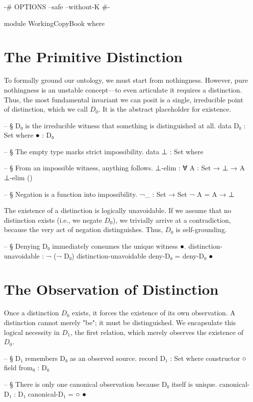 \documentclass[11pt,a4paper]{book}
\begin{document}
\begin{code}
{-# OPTIONS --safe --without-K #-}

module WorkingCopyBook where
\end{code}

\section{The Primitive Distinction}

To formally ground our ontology, we must start from nothingness. However, pure nothingness is an unstable concept—to even articulate it requires a distinction. Thus, the most fundamental invariant we can posit is a single, irreducible point of distinction, which we call $D_0$. It is the abstract placeholder for existence.

\begin{code}
-- § D₀ is the irreducible witness that something is distinguished at all.
data D₀ : Set where
  ● : D₀

-- § The empty type marks strict impossibility.
data ⊥ : Set where

-- § From an impossible witness, anything follows.
⊥-elim : ∀ {A : Set} → ⊥ → A
⊥-elim ()

-- § Negation is a function into impossibility.
¬_ : Set → Set
¬ A = A → ⊥
\end{code}

The existence of a distinction is logically unavoidable. If we assume that no distinction exists (i.e., we negate $D_0$), we trivially arrive at a contradiction, because the very act of negation distinguishes. Thus, $D_0$ is self-grounding.

\begin{code}
-- § Denying D₀ immediately consumes the unique witness ●.
distinction-unavoidable : ¬ (¬ D₀)
distinction-unavoidable deny-D₀ = deny-D₀ ●
\end{code}

\section{The Observation of Distinction}

Once a distinction $D_0$ exists, it forces the existence of its own observation. A distinction cannot merely "be"; it must be distinguished. We encapsulate this logical necessity in $D_1$, the first relation, which merely observes the existence of $D_0$.

\begin{code}
-- § D₁ remembers D₀ as an observed source.
record D₁ : Set where
  constructor ○
  field
    from₀ : D₀

-- § There is only one canonical observation because D₀ itself is unique.
canonical-D₁ : D₁
canonical-D₁ = ○ ●
\end{code}
\end{document}
